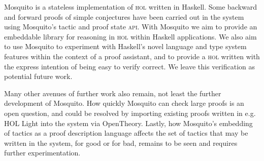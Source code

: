 \documentclass{llncs}
\newcommand{\mosquito}{Mosquito\xspace}
\begin{document}
\mosquito is a stateless implementation of \textsc{hol} written in Haskell.
Some backward and forward proofs of simple conjectures have been carried out in the system using \mosquito's tactic and proof state \textsc{api}.
With \mosquito we aim to provide an embeddable library for reasoning in \textsc{hol} within Haskell applications.
We also aim to use \mosquito to experiment with Haskell's novel language and type system features within the context of a proof assistant, and to provide a \textsc{hol} written with the express intention of being easy to verify correct.
We leave this verification as potential future work.

Many other avenues of further work also remain, not least the further development of \mosquito.
How quickly \mosquito can check large proofs is an open question, and could be resolved by importing existing proofs written in e.g. HOL Light into the system via OpenTheory.
Lastly, how \mosquito's embedding of tactics as a proof description language affects the set of tactics that may be written in the system, for good or for bad, remains to be seen and requires further experimentation.


\end{document}
